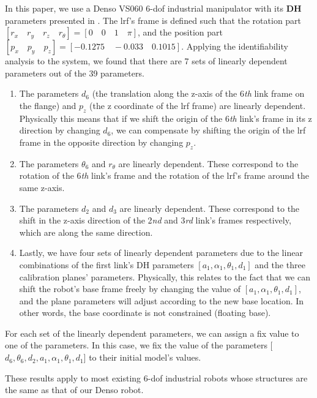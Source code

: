 In this paper, we use a Denso VS060 6-\ac{dof} industrial manipulator with its \textbf{DH} parameters presented in . The \ac{lrf}'s frame is defined such that the rotation part $[r_x \quad r_y \quad r_z \quad r_{\theta}] = [0 \quad 0 \quad 1 \quad \pi]$, and the position part $[p_x \quad p_y\quad p_z] = [-0.1275 \quad -0.033 \quad 0.1015]$. Applying the identifiability analysis to the system, we found that there are 7 sets of linearly dependent parameters out of the 39 parameters. 
\begin{enumerate}
\item The parameters $d_6$ (the translation along the z-axis of the 6\textit{th} link frame on the flange) and $p_z$ (the z coordinate of the \ac{lrf} frame) are linearly dependent. Physically this means that if we shift the origin of the 6\textit{th} link's frame  in its z direction by changing $d_6$, we can compensate by shifting the origin of the \ac{lrf} frame in the opposite direction by changing $p_z$.
\item The parameters $\theta_6$ and $r_\theta$ are linearly dependent. These correspond to the rotation of the 6\textit{th} link's frame and the rotation of the \ac{lrf}'s frame around the same z-axis. 
\item The parameters $d_2$ and $d_3$ are linearly dependent. These correspond to the shift in the z-axis direction of the 2\textit{nd} and 3\textit{rd} link's frames respectively, which are along the same direction. 
\item Lastly, we have four sets of linearly dependent parameters due to the linear combinations of the first link's DH parameters $[a_1, \alpha_1, \theta_1, d_1 ]$ and the three calibration planes' parameters. Physically, this relates to the fact that we can shift the robot's base frame freely by changing the value of $[a_1, \alpha_1, \theta_1, d_1]$, and the plane parameters will adjust according to the new base location. In other words, the base coordinate is not constrained (floating base). 
\end{enumerate}

For each set of the linearly dependent parameters, we can assign a fix value to one of the parameters. In this case, we fix the value of the parameters [$d_6, \theta_6, d_2, a_1, \alpha_1, \theta_1, d_1$] to their initial model's values. 

These results apply to most existing 6-\ac{dof} industrial robots whose structures are the same as that of our Denso robot. 


